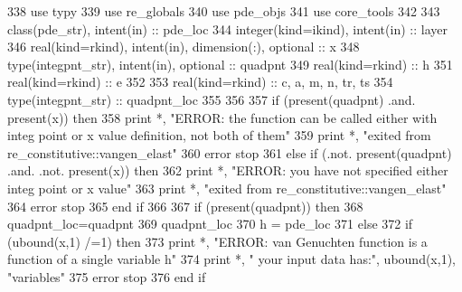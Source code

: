 \begin{DoxyCode}
338       \textcolor{keywordtype}{use }typy
339       \textcolor{keywordtype}{use }re_globals
340       \textcolor{keywordtype}{use }pde_objs
341       \textcolor{keywordtype}{use }core_tools
342 
343       \textcolor{keywordtype}{class}(pde_str), \textcolor{keywordtype}{intent(in)} :: pde\_loc 
344       \textcolor{keywordtype}{integer(kind=ikind)}, \textcolor{keywordtype}{intent(in)} :: layer
346       \textcolor{keywordtype}{real(kind=rkind)}, \textcolor{keywordtype}{intent(in)}, \textcolor{keywordtype}{dimension(:)},  \textcolor{keywordtype}{optional} :: x
348       \textcolor{keywordtype}{type}(integpnt_str), \textcolor{keywordtype}{intent(in)}, \textcolor{keywordtype}{optional} :: quadpnt
349       \textcolor{keywordtype}{real(kind=rkind)} :: h
351       \textcolor{keywordtype}{real(kind=rkind)} :: e
352 
353       \textcolor{keywordtype}{real(kind=rkind)} :: c, a, m, n, tr, ts 
354       \textcolor{keywordtype}{type}(integpnt_str) :: quadpnt\_loc      
355           
356       
357       \textcolor{keywordflow}{if} (\textcolor{keyword}{present}(quadpnt) .and. \textcolor{keyword}{present}(x)) \textcolor{keywordflow}{then}
358         print *, \textcolor{stringliteral}{"ERROR: the function can be called either with integ point or x value definition, not both
       of them"}
359         print *, \textcolor{stringliteral}{"exited from re\_constitutive::vangen\_elast"}
360         error stop
361       \textcolor{keywordflow}{else} \textcolor{keywordflow}{if} (.not. \textcolor{keyword}{present}(quadpnt) .and. .not. \textcolor{keyword}{present}(x)) \textcolor{keywordflow}{then}
362         print *, \textcolor{stringliteral}{"ERROR: you have not specified either integ point or x value"}
363         print *, \textcolor{stringliteral}{"exited from re\_constitutive::vangen\_elast"}
364         error stop
365 \textcolor{keywordflow}{      end if}
366       
367       \textcolor{keywordflow}{if} (\textcolor{keyword}{present}(quadpnt)) \textcolor{keywordflow}{then}
368         quadpnt\_loc=quadpnt
369         quadpnt\_loc%
370         h = pde\_loc%
371       \textcolor{keywordflow}{else}
372         \textcolor{keywordflow}{if} (ubound(x,1) /=1) \textcolor{keywordflow}{then}
373           print *, \textcolor{stringliteral}{"ERROR: van Genuchten function is a function of a single variable h"}
374           print *, \textcolor{stringliteral}{"       your input data has:"}, ubound(x,1), \textcolor{stringliteral}{"variables"}
375           error stop
376 \textcolor{keywordflow}{        end if}

\end{DoxyCode}
